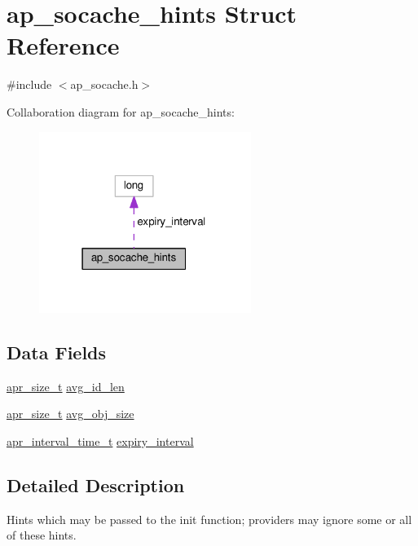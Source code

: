 \hypertarget{structap__socache__hints}{}\section{ap\+\_\+socache\+\_\+hints Struct Reference}
\label{structap__socache__hints}


{\ttfamily \#include $<$ap\+\_\+socache.\+h$>$}



Collaboration diagram for ap\+\_\+socache\+\_\+hints\+:
\nopagebreak
\begin{figure}[H]
\begin{center}
\leavevmode
\includegraphics[width=195pt]{structap__socache__hints__coll__graph}
\end{center}
\end{figure}
\subsection*{Data Fields}
\begin{DoxyCompactItemize}
\item 
\hyperlink{group__apr__platform_gaaa72b2253f6f3032cefea5712a27540e}{apr\+\_\+size\+\_\+t} \hyperlink{structap__socache__hints_a0f488d4e96758190d2d12ce1b540cd34}{avg\+\_\+id\+\_\+len}
\item 
\hyperlink{group__apr__platform_gaaa72b2253f6f3032cefea5712a27540e}{apr\+\_\+size\+\_\+t} \hyperlink{structap__socache__hints_a1a590432f0b8147d98e50367c6c98aef}{avg\+\_\+obj\+\_\+size}
\item 
\hyperlink{group__apr__time_gaae2129185a395cc393f76fabf4f43e47}{apr\+\_\+interval\+\_\+time\+\_\+t} \hyperlink{structap__socache__hints_afad2c05e98ed1dd238de5eddbc639f92}{expiry\+\_\+interval}
\end{DoxyCompactItemize}


\subsection{Detailed Description}
Hints which may be passed to the init function; providers may ignore some or all of these hints. 

